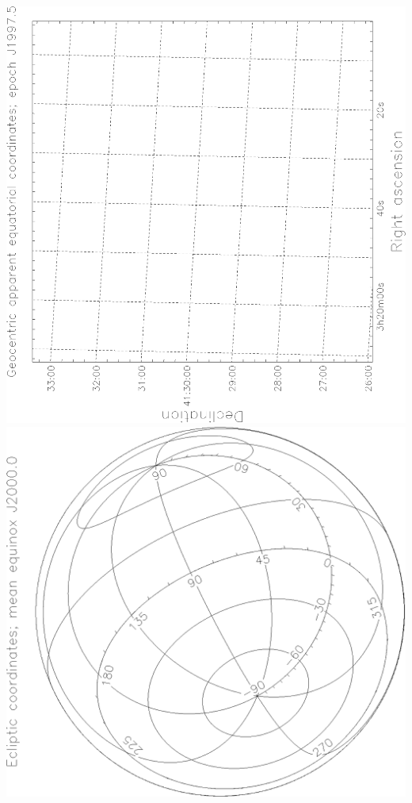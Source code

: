 \documentclass[twoside,11pt]{article}
\newenvironment{latexonly}{}{}
\begin{document}
\begin{latexonly}
   \begin{center}
   \mbox{}\hfill
   \includegraphics[scale=0.25,angle=-90]{sun210_figures/fronta_bw.eps}\hfill
   \includegraphics[scale=0.25,angle=-90]{sun210_figures/frontb_bw.eps}\hfill

\end{center}
\end{latexonly}
\end{document}
